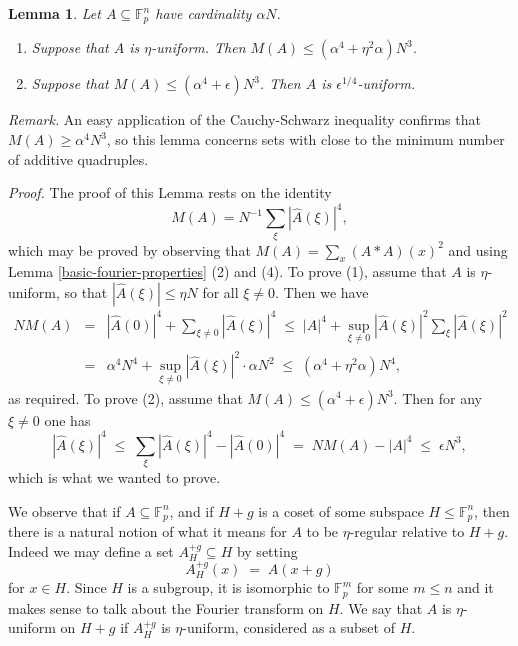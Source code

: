 \documentclass[12pt,a4paper,reqno]{amsart}
\numberwithin{equation}{section}
\theoremstyle{plain}
\newtheorem{lemma}[subsection]{Lemma}
\theoremstyle{definition}
\renewcommand{\leq}{\leqslant}
\renewcommand{\geq}{\geqslant}
\def\proof{\noindent\textit{Proof. }}
\def\endproof{\hfill{\usebox{\proofbox}}}
\def\Agh{A_H^{+g}}
\begin{document}
\begin{lemma}\label{add-quad-lem} Let $A \subseteq \mathbb{F}_p^n$ have cardinality $\alpha N$. 
\begin{enumerate}
\item Suppose that $A$ is $\eta$-uniform. Then $M(A) \leq (\alpha^4 + \eta^2 \alpha)N^3$.
\item Suppose that $M(A) \leq (\alpha^4 + \epsilon) N^3$. Then $A$ is $\epsilon^{1/4}$-uniform.
\end{enumerate}
\end{lemma}
\noindent\textit{Remark.} An easy application of the Cauchy-Schwarz inequality confirms that $M(A) \geq \alpha^4 N^3$, so this lemma concerns sets with close to the minimum number of additive quadruples.\vspace{11pt}

\proof The proof of this Lemma rests on the identity
\[ M(A) = N^{-1}\sum_{\xi} |\widehat{A}(\xi)|^4,\] which may be proved by observing that $M(A) = \sum_x (A \ast A)(x)^2$ and using Lemma \ref{basic-fourier-properties} (2) and (4). To prove (1), assume that $A$ is $\eta$-uniform, so that $|\widehat{A}(\xi)| \leq \eta N$ for all $\xi \neq 0$. Then we have
\begin{eqnarray*}
N M(A) & = & |\widehat{A}(0)|^4 + \sum_{\xi \neq 0} |\widehat{A}(\xi)|^4 \;\leq \; |A|^4 + \sup_{\xi \neq 0} |\widehat{A}(\xi)|^2\sum_{\xi} |\widehat{A}(\xi)|^2 \\ & = & \alpha^4 N^4 + \sup_{\xi \neq 0} |\widehat{A}(\xi)|^2 \cdot \alpha N^2 \; \leq \; (\alpha^4 + \eta^2 \alpha) N^4,\end{eqnarray*} as required.
To prove (2), assume that $M(A) \leq (\alpha^4 + \epsilon) N^3$. Then for any $\xi \neq 0$ one has
\[
|\widehat{A}(\xi)|^4 \; \leq \; \sum_{\xi} |\widehat{A}(\xi)|^4 - |\widehat{A}(0)|^4 \; = \; NM(A) - |A|^4 \; \leq \; \epsilon N^3,\]
which is what we wanted to prove.\endproof\vspace{11pt}

\noindent We observe that if $A \subseteq \mathbb{F}_p^n$, and if $H + g$ is a coset of some subspace $H \leq \mathbb{F}_p^n$, then there is a natural notion of what it means for $A$ to be $\eta$-regular relative to $H + g$.
Indeed we may define a set $\Agh \subseteq H$ by setting
\[ \Agh(x) \; = \; A(x + g)\] for $x \in H$. Since $H$ is a subgroup, it is isomorphic to $\mathbb{F}_p^m$ for some $m \leq n$ and it makes sense to talk about the Fourier transform on $H$. We say that $A$ is $\eta$-uniform on $H + g$ if $\Agh$ is $\eta$-uniform, considered as a subset of $H$.\vspace{11pt}
\end{document}
